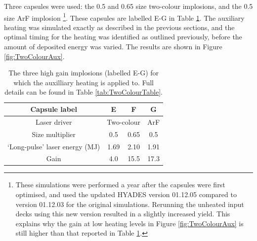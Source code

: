 Three capsules were used: the 0.5 and 0.65 size two-colour implosions, and the 0.5 size ArF implosion \footnote{These simulations were performed a year after the capsules were first optimised, and used the updated HYADES version 01.12.05 compared to version 01.12.03 for the original simulations. Rerunning the unheated input decks using this new version resulted in a slightly increased yield. This explains why the gain at low heating levels in Figure \ref{fig:TwoColourAux} is still higher than that reported in Table \ref{tab:Heating two colour capsules}.}.  These capsules are labelled E-G in Table \ref{tab:Heating two colour capsules}. The auxiliary heating was simulated exactly as described in the previous sections, and the optimal timing for the heating was identified as outlined previously, before the amount of deposited energy was varied. The results are shown in Figure \ref{fig:TwoColourAux}.

\begin{table}
\centering
\begin{tabular}{|c|c|c|c|}
\hline
Capsule label &  E & F & G  \\ 
\hline
Laser driver & \multicolumn{2}{c|}{Two-colour} & ArF \\ 
\hline
Size multiplier & 0.5 & 0.65 & 0.5 \\
\hline
`Long-pulse' laser energy (MJ) & 1.69  & 2.10 & 1.91 \\ 
Gain & 4.0 & 15.5 & 17.3 \\ 
\hline
  \end{tabular}
  \caption{The three high gain implosions (labelled E-G) for which the auxilliary heating is applied to. Full details can be found in Table \ref{tab:TwoColourTable}.}
  \label{tab:Heating two colour capsules}
\end{table}

